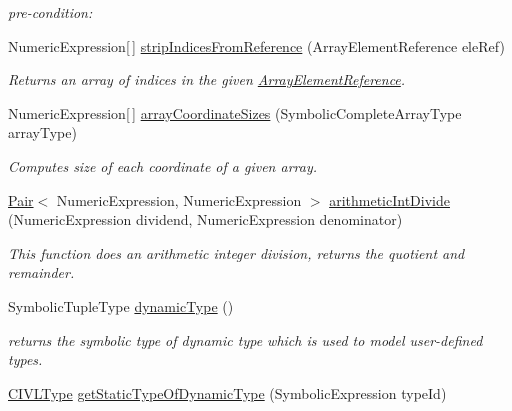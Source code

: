 \begin{DoxyCompactItemize}
\begin{DoxyCompactList}\small\item\em pre-\/condition\+: \end{DoxyCompactList}\item 
Numeric\+Expression\mbox{[}$\,$\mbox{]} \hyperlink{interfaceedu_1_1udel_1_1cis_1_1vsl_1_1civl_1_1dynamic_1_1IF_1_1SymbolicUtility_a45145c8a687f3bdd5baecb1a56f9c457}{strip\+Indices\+From\+Reference} (Array\+Element\+Reference ele\+Ref)
\begin{DoxyCompactList}\small\item\em Returns an array of indices in the given \hyperlink{}{Array\+Element\+Reference}. \end{DoxyCompactList}\item 
Numeric\+Expression\mbox{[}$\,$\mbox{]} \hyperlink{interfaceedu_1_1udel_1_1cis_1_1vsl_1_1civl_1_1dynamic_1_1IF_1_1SymbolicUtility_ab6b9bf10aed1a24050ddd26257024206}{array\+Coordinate\+Sizes} (Symbolic\+Complete\+Array\+Type array\+Type)
\begin{DoxyCompactList}\small\item\em Computes size of each coordinate of a given array. \end{DoxyCompactList}\item 
\hyperlink{classedu_1_1udel_1_1cis_1_1vsl_1_1civl_1_1util_1_1IF_1_1Pair}{Pair}$<$ Numeric\+Expression, Numeric\+Expression $>$ \hyperlink{interfaceedu_1_1udel_1_1cis_1_1vsl_1_1civl_1_1dynamic_1_1IF_1_1SymbolicUtility_af3a0c32caeff3ded56834d853aae6ed4}{arithmetic\+Int\+Divide} (Numeric\+Expression dividend, Numeric\+Expression denominator)
\begin{DoxyCompactList}\small\item\em This function does an arithmetic integer division, returns the quotient and remainder. \end{DoxyCompactList}\item 
Symbolic\+Tuple\+Type \hyperlink{interfaceedu_1_1udel_1_1cis_1_1vsl_1_1civl_1_1dynamic_1_1IF_1_1SymbolicUtility_ab861fc6203189623bb190e9033fc5de9}{dynamic\+Type} ()
\begin{DoxyCompactList}\small\item\em returns the symbolic type of dynamic type which is used to model user-\/defined types. \end{DoxyCompactList}\item 
\hyperlink{interfaceedu_1_1udel_1_1cis_1_1vsl_1_1civl_1_1model_1_1IF_1_1type_1_1CIVLType}{C\+I\+V\+L\+Type} \hyperlink{interfaceedu_1_1udel_1_1cis_1_1vsl_1_1civl_1_1dynamic_1_1IF_1_1SymbolicUtility_a100acc20048188a6b5f616e8856f63b6}{get\+Static\+Type\+Of\+Dynamic\+Type} (Symbolic\+Expression type\+Id)

\end{DoxyCompactItemize}
